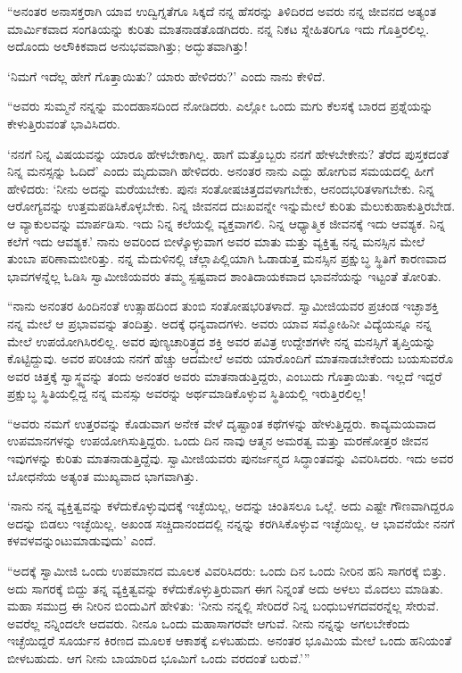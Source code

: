  “ಅನಂತರ ಅನಾಸಕ್ತರಾಗಿ ಯಾವ ಉದ್ವಿಗ್ನತೆಗೂ ಸಿಕ್ಕದೆ ನನ್ನ ಹೆಸರನ್ನು ತಿಳಿದಿರದ ಅವರು ನನ್ನ ಜೀವನದ ಅತ್ಯಂತ ಮಾರ್ಮಿಕವಾದ ಸಂಗತಿಯನ್ನು ಕುರಿತು ಮಾತನಾಡತೊಡಗಿದರು. ನನ್ನ ನಿಕಟ ಸ್ನೇಹಿತರಿಗೂ ಇದು ಗೊತ್ತಿರಲಿಲ್ಲ. ಅದೊಂದು ಅಲೌಕಿಕವಾದ ಅನುಭವವಾಗಿತ್ತು; ಅದ್ಭುತವಾಗಿತ್ತು!

 ‘ನಿಮಗೆ ಇದೆಲ್ಲ ಹೇಗೆ ಗೊತ್ತಾಯಿತು? ಯಾರು ಹೇಳಿದರು?’ ಎಂದು ನಾನು ಕೇಳಿದೆ. 

 “ಅವರು ಸುಮ್ಮನೆ ನನ್ನನ್ನು ಮಂದಹಾಸದಿಂದ ನೋಡಿದರು. ಎಲ್ಲೋ ಒಂದು ಮಗು ಕೆಲಸಕ್ಕೆ ಬಾರದ ಪ್ರಶ್ನೆಯನ್ನು ಕೇಳುತ್ತಿರುವಂತೆ ಭಾವಿಸಿದರು.

 ‘ನನಗೆ ನಿನ್ನ ವಿಷಯವನ್ನು ಯಾರೂ ಹೇಳಬೇಕಾಗಿಲ್ಲ. ಹಾಗೆ ಮತ್ತೊಬ್ಬರು ನನಗೆ ಹೇಳಬೇಕೇನು? ತೆರೆದ ಪುಸ್ತಕದಂತೆ ನಿನ್ನ ಮನಸ್ಸನ್ನು ಓದಿದೆ’ ಎಂದು ಮೃದುವಾಗಿ ಹೇಳಿದರು. ಅನಂತರ ನಾನು ಎದ್ದು ಹೋಗುವ ಸಮಯದಲ್ಲಿ ಹೀಗೆ ಹೇಳಿದರು: ‘ನೀನು ಅದನ್ನು ಮರೆಯಬೇಕು. ಪುನಃ ಸಂತೋಷಚಿತ್ತದವಳಾಗಬೇಕು, ಆನಂದಭರಿತಳಾಗಬೇಕು. ನಿನ್ನ ಆರೋಗ್ಯವನ್ನು ಉತ್ತಮಪಡಿಸಿಕೊಳ್ಳಬೇಕು. ನಿನ್ನ ಜೀವನದ ದುಃಖವನ್ನೇ ಇನ್ನುಮೇಲೆ ಕುರಿತು ಮೆಲುಕುಹಾಕುತ್ತಿರಬೇಡ. ಆ ವ್ಯಾಕುಲವನ್ನು ಮಾರ್ಪಡಿಸು. ಇದು ನಿನ್ನ ಕಲೆಯಲ್ಲಿ ವ್ಯಕ್ತವಾಗಲಿ. ನಿನ್ನ ಆಧ್ಯಾತ್ಮಿಕ ಜೀವನಕ್ಕೆ ಇದು ಆವಶ್ಯಕ. ನಿನ್ನ ಕಲೆಗೆ ಇದು ಆವಶ್ಯಕ.’ ನಾನು ಅವರಿಂದ ಬೀಳ್ಕೊಳ್ಳುವಾಗ ಅವರ ಮಾತು ಮತ್ತು ವ್ಯಕ್ತಿತ್ವ ನನ್ನ ಮನಸ್ಸಿನ ಮೇಲೆ ತುಂಬಾ ಪರಿಣಾಮಬೀರಿತ್ತು. ನನ್ನ ಮೆದುಳಿನಲ್ಲಿ ಚೆಲ್ಲಾಪಿಲ್ಲಿಯಾಗಿ ಓಡಾಡುತ್ತ ಮನಸ್ಸಿನ ಪ್ರಕ್ಷುಬ್ಧ ಸ್ಥಿತಿಗೆ ಕಾರಣವಾದ ಭಾವಗಳನ್ನೆಲ್ಲ ಓಡಿಸಿ ಸ್ವಾಮೀಜಿಯವರು ತಮ್ಮ ಸ್ಪಷ್ಟವಾದ ಶಾಂತಿದಾಯಕವಾದ ಭಾವನೆಯನ್ನು ಇಟ್ಟಂತೆ ತೋರಿತು. 

 “ನಾನು ಅನಂತರ ಹಿಂದಿನಂತೆ ಉತ್ಸಾಹದಿಂದ ತುಂಬಿ ಸಂತೋಷಭರಿತಳಾದೆ. ಸ್ವಾಮೀಜಿಯವರ ಪ್ರಚಂಡ ಇಚ್ಛಾಶಕ್ತಿ ನನ್ನ ಮೇಲೆ ಆ ಪ್ರಭಾವವನ್ನು ತಂದಿತ್ತು. ಅದಕ್ಕೆ ಧನ್ಯವಾದಗಳು. ಅವರು ಯಾವ ಸಮ್ಮೋಹಿನೀ ವಿದ್ಯೆಯನ್ನೂ ನನ್ನ ಮೇಲೆ ಉಪಯೋಗಿಸಿರಲಿಲ್ಲ. ಅವರ ಪುಣ್ಯಚಾರಿತ್ರ್ಯದ ಶಕ್ತಿ ಅವರ ಪವಿತ್ರ ಉದ್ದೇಶಗಳೇ ನನ್ನ ಮನಸ್ಸಿಗೆ ತೃಪ್ತಿಯನ್ನು ಕೊಟ್ಟಿದ್ದುವು. ಅವರ ಪರಿಚಯ ನನಗೆ ಹೆಚ್ಚು ಆದಮೇಲೆ ಅವರು ಯಾರೊಂದಿಗೆ ಮಾತನಾಡಬೇಕೆಂದು ಬಯಸುವರೊ ಅವರ ಚಿತ್ತಕ್ಕೆ ಸ್ವಾಸ್ಥ್ಯ\-ವನ್ನು ತಂದು ಅನಂತರ ಅವರು ಮಾತನಾಡುತ್ತಿದ್ದರು, ಎಂಬುದು ಗೊತ್ತಾಯಿತು. ಇಲ್ಲದೆ ಇದ್ದರೆ ಪ್ರಕ್ಷುಬ್ಧ ಸ್ಥಿತಿಯಲ್ಲಿದ್ದ ನನ್ನ ಮನಸ್ಸು ಅವರನ್ನು ಅರ್ಥಮಾಡಿಕೊಳ್ಳುವ ಸ್ಥಿತಿಯಲ್ಲಿ ಇರುತ್ತಿರಲಿಲ್ಲ!

“ಅವರು ನಮಗೆ ಉತ್ತರವನ್ನು ಕೊಡುವಾಗ ಅನೇಕ ವೇಳೆ ದೃಷ್ಟಾಂತ ಕಥೆಗಳನ್ನು ಹೇಳುತ್ತಿದ್ದರು. ಕಾವ್ಯಮಯವಾದ ಉಪಮಾನಗಳನ್ನು ಉಪಯೋಗಿಸುತ್ತಿದ್ದರು. ಒಂದು ದಿನ ನಾವು ಆತ್ಮನ ಅಮರತ್ವ ಮತ್ತು ಮರಣೋತ್ತರ ಜೀವನ ಇವುಗಳನ್ನು ಕುರಿತು ಮಾತನಾಡುತ್ತಿದ್ದೆವು. ಸ್ವಾಮೀಜಿಯವರು ಪುನರ್ಜನ್ಮದ ಸಿದ್ಧಾಂತವನ್ನು ವಿವರಿಸಿದರು. ಇದು ಅವರ ಬೋಧನೆಯ ಅತ್ಯಂತ ಮುಖ್ಯವಾದ ಭಾಗವಾಗಿತ್ತು.

 ‘ನಾನು ನನ್ನ ವ್ಯಕ್ತಿತ್ವವನ್ನು ಕಳೆದುಕೊಳ್ಳುವುದಕ್ಕೆ ಇಚ್ಛೆಯಿಲ್ಲ, ಅದನ್ನು ಚಿಂತಿಸಲೂ ಒಲ್ಲೆ. ಅದು ಎಷ್ಟೇ ಗೌಣವಾಗಿದ್ದರೂ ಅದನ್ನು ಬಿಡಲು ಇಚ್ಛೆಯಿಲ್ಲ. ಅಖಂಡ ಸಚ್ಚಿದಾನಂದದಲ್ಲಿ ನನ್ನನ್ನು ಕರಗಿಸಿಕೊಳ್ಳುವ ಇಚ್ಛೆಯಿಲ್ಲ. ಆ ಭಾವನೆಯೇ ನನಗೆ ಕಳವಳವನ್ನುಂಟುಮಾಡುವುದು’ ಎಂದೆ. 

“ಅದಕ್ಕೆ ಸ್ವಾಮೀಜಿ ಒಂದು ಉಪಮಾನದ ಮೂಲಕ ವಿವರಿಸಿದರು: ಒಂದು ದಿನ ಒಂದು ನೀರಿನ ಹನಿ ಸಾಗರಕ್ಕೆ ಬಿತ್ತು. ಅದು ಸಾಗರಕ್ಕೆ ಬಿದ್ದು ತನ್ನ ವ್ಯಕ್ತಿತ್ವವನ್ನು ಕಳೆದುಕೊಳ್ಳುತ್ತಿರುವಾಗ ಈಗ ನಿನ್ನಂತೆ ಅದು ಅಳಲು ಮೊದಲು ಮಾಡಿತು. ಮಹಾ ಸಮುದ್ರ ಈ ನೀರಿನ ಬಿಂದುವಿಗೆ ಹೇಳಿತು: ‘ನೀನು ನನ್ನಲ್ಲಿ ಸೇರಿದರೆ ನಿನ್ನ ಬಂಧುಬಳಗದವರನ್ನೆಲ್ಲ ಸೇರುವೆ. ಅವರೆಲ್ಲ ನನ್ನಿಂದಲೇ‌ ಆದವರು. ನೀನೂ ಒಂದು ಮಹಾಸಾಗರವೇ ಆಗುವೆ. ನೀನು ನನ್ನನ್ನು ಅಗಲಬೇಕೆಂದು ಇಚ್ಛೆಯಿದ್ದರೆ ಸೂರ್ಯನ ಕಿರಣದ ಮೂಲಕ ಆಕಾಶಕ್ಕೆ ಏಳಬಹುದು. ಅನಂತರ ಭೂಮಿಯ ಮೇಲೆ ಒಂದು ಹನಿಯಂತೆ ಬೀಳಬಹುದು. ಆಗ ನೀನು ಬಾಯಾರಿದ ಭೂಮಿಗೆ ಒಂದು ವರದಂತೆ ಬರುವೆ.’” 

